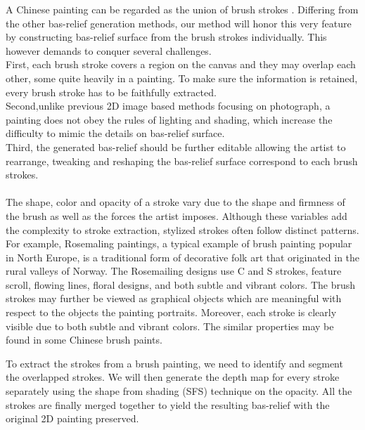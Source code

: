 A Chinese painting can be regarded as the union of brush strokes \cite{xu2006animating}. Differing from the other bas-relief generation methods, our method will honor this very feature by constructing bas-relief surface from the brush strokes individually. This however demands to conquer several challenges. \\
First, each brush stroke covers a region on the canvas and they may overlap each other, some quite heavily in a painting. To make sure the information is retained, every brush stroke has to be faithfully extracted.\\ Second,unlike previous 2D image based methods focusing on photograph, a painting does not obey the rules of lighting and shading, which increase the difficulty to mimic the details on bas-relief surface. \\Third, the generated bas-relief should be further editable allowing the artist to rearrange, tweaking and reshaping the bas-relief surface correspond to each brush strokes. \\  \\

The shape, color and opacity of a stroke vary due to the shape and firmness of the brush as well as the forces the artist imposes. Although these variables add the complexity to stroke extraction, stylized strokes often follow distinct patterns. For example, Rosemaling paintings, a typical example of brush painting popular in North Europe, is a traditional form of decorative folk art that originated in the rural valleys of Norway. The Rosemailing designs use C and S strokes, feature scroll, flowing lines, floral designs, and both subtle and vibrant colors. The brush strokes may further be viewed as graphical objects which are meaningful with respect to the objects the painting portraits. Moreover, each stroke is clearly visible due to both subtle and vibrant colors. The similar properties may be found in some Chinese brush paints.

To extract the strokes from a brush painting, we need to identify and segment the overlapped strokes. We will then generate the depth map for every stroke separately using the shape from shading (SFS) technique on the opacity. All the strokes are finally merged together to yield the resulting bas-relief with the original 2D painting preserved. 

